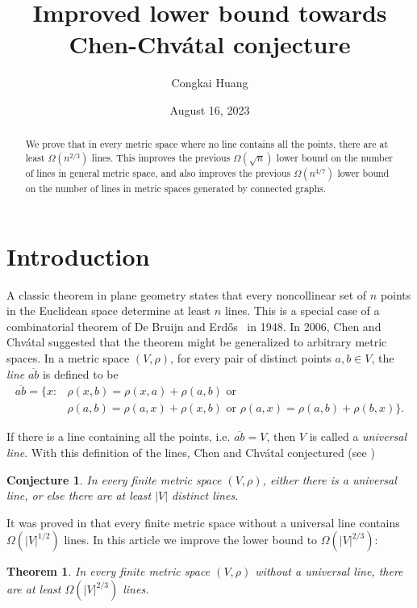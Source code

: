 \documentclass[12pt]{article}
\title{Improved lower bound towards Chen-Chv\'atal conjecture}
\author[1]{Congkai Huang}
\date{August 16, 2023}
\affil[1]{School of Mathematical Sciences, Peking University, Beijing, China}
\newcommand{\ov}{\overline}
\newtheorem{thm}{Theorem}
\newtheorem{conj}{Conjecture}
\begin{document}
\maketitle

\begin{abstract}
We prove that in every metric space where no line contains all the points, there are at least
$\Omega(n^{2/3})$ lines. This improves the previous $\Omega(\sqrt{n})$ lower bound on the 
number of lines in general metric space, and also improves the previous $\Omega(n^{4/7})$ lower bound on the number of lines
in metric spaces generated by connected graphs.
\end{abstract}

\section{Introduction}

A classic theorem in plane geometry states that every noncollinear set of $n$ points in the Euclidean space determine at least $n$ lines. This is a special case of a combinatorial theorem of De Bruijn and Erd\H{o}s~\cite{DBE} in 1948. In 2006, Chen and Chv\'{a}tal suggested that the theorem might be generalized to arbitrary metric spaces. In a metric space $(V, \rho)$,
for every pair of distinct points $a, b \in V$, the {\em line} $\ov{ab}$ is defined to be
\[
\begin{split}
\ov{ab} = \{x : & \rho(x, b) = \rho(x, a) + \rho(a, b) \text{ or } \\
& \rho(a, b) = \rho(a, x) + \rho(x, b) \text{ or } \rho(a, x) = \rho(a, b) + \rho(b, x) \}.
\end{split}
\]

If there is a line containing all the points, i.e. $\ov{ab} = V$, then $V$ is called a {\em universal line}. With this definition of the lines, Chen and Chv\'{a}tal conjectured (see \cite{CC})

\begin{conj}\label{conj.cc} In every finite metric space $(V, \rho)$, either there is a universal line, or else there are at least $|V|$ distinct lines.
\end{conj}

It was proved in \cite{ACHKS} that every finite metric space without a universal line
contains $\Omega(|V|^{1/2})$ lines. In this article we improve the lower bound to $\Omega(|V|^{2/3})$:

\begin{thm}\label{thm.main}
In every finite metric space $(V, \rho)$ without a universal line, there are at least $\Omega(|V|^{2/3})$ lines.
\end{thm}
\end{document}
